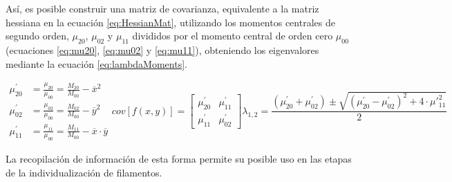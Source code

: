 As\'i, es posible construir una matriz de covarianza, equivalente a la matriz hessiana en la ecuaci\'on \eqref{eq:HessianMat}, utilizando los momentos centrales de segundo orden, $\mu_{20}$, $\mu_{02}$ y $\mu_{11}$ divididos por el momento central de orden cero $\mu_{00}$ (ecuaciones \eqref{eq:mu20}, \eqref{eq:mu02} y \eqref{eq:mu11}), obteniendo los eigenvalores mediante la ecuaci\'on \eqref{eq:lambdaMoments}.

\begin{subequations}
\begin{align}
    \mu_{20}^{\prime} &= \frac{\mu_{20}}{\mu_{00}} = \frac{M_{20}}{M_{00}} - \overline{x}^{2} \label{eq:mu20} \\
    \mu_{02}^{\prime} &= \frac{\mu_{02}}{\mu_{00}} = \frac{M_{02}}{M_{00}} - \overline{y}^{2} \label{eq:mu02} \\
    \mu_{11}^{\prime} &= \frac{\mu_{11}}{\mu_{00}} = \frac{M_{11}}{M_{00}} - \overline{x}\cdot\overline{y} \label{eq:mu11}
\end{align}

\begin{equation}
    \label{eq:covMatLambda}
    cov[f(x,y)] = \begin{bmatrix}
        \mu_{20}^{\prime} & \mu_{11}^{\prime} \\
        \mu_{11}^{\prime} & \mu_{02}^{\prime} 
        \end{bmatrix}
\end{equation}

\begin{equation}
    \label{eq:lambdaMoments}
    \lambda_{1,2} = \dfrac{(\mu_{20}^{\prime} + \mu_{02}^{\prime}) \pm \sqrt{(\mu_{20}^{\prime} - \mu_{02}^{\prime})^{2} + 4\cdot \mu\prime_{11}^{2} }}{2}
\end{equation}
\end{subequations}

La recopilaci\'on de informaci\'on de esta forma permite su posible uso en las etapas de la individualizaci\'on de filamentos.



